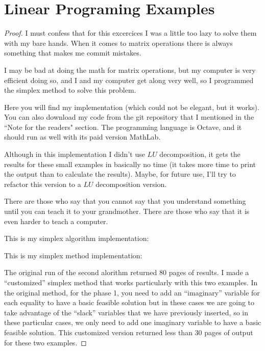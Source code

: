 ﻿\chapter{Linear Programing Examples}


\begin{proof}
    I must confess that for this excercices I was a little too lazy to solve them with my bare hands.
    When it comes to matrix operations there is always something that makes me commit mistakes.\pn
    
    I may be bad at doing the math for matrix operations, but my computer is very efficient doing so,
    and I and my computer get along  very well, so I programmed the simplex method to solve this problem.\pn
    
    Here you will find my implementation (which could not be elegant, but it works). You can also download my code from
    the git repository that I mentioned in the ``Note for the readers" section. The programming language is Octave, and it should
    run as well with its paid version MathLab.\pn
    
    Although in this implementation I didn't use $LU$ decomposition, it gets the results for these small examples in
    basically no time (it takes more time to print the output than to calculate the results). Maybe, for future use,
    I'll try to refactor this version to a $LU$ decomposition version.\pn
    
    There are those who say that you cannot say that you understand something until you can teach it to your grandmother.
    There are those who say that it is even harder to teach a computer.\pn
        
    \newpage
    This is my simplex algorithm implementation:
    \small
    
    \normalsize
    
    \newpage
    This is my simplex method implementation:
    \small
    
    \normalsize
    
    The original run of the second alorithm returned $80$ pages of results. I made a ``customized'' simplex method that works particularly
    with this two examples. In the original method, for the phase 1, you need to add an ``imaginary'' variable for each equality to have a 
    basic feasible solution but in these cases we are going to take advantage of the ``slack'' variables that we have previously inserted, so
    in these particular cases, we only need to add one imaginary variable to have a basic feasible solution. This customized version returned
    less than 30 pages of output for these two examples.\pn
        

\end{proof}
